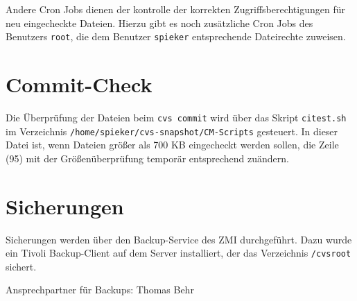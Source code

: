 \documentclass[a4paper, 10pt]{article}
\newcommand{\file}[1]{\texttt{#1}}
\begin{document}
Andere Cron Jobs dienen der kontrolle der korrekten Zugriffsberechtigungen f\"ur
neu eingecheckte Dateien. Hierzu gibt es noch zus\"atzliche Cron Jobs des Benutzers
\file{root}, die dem Benutzer \file{spieker} entsprechende Dateirechte zuweisen.

\section{Commit-Check}
Die \"Uberpr\"ufung der Dateien beim \file{cvs commit} wird \"uber das Skript
\file{citest.sh} im Verzeichnis \file{/home/spieker/cvs-snapshot/CM-Scripts}
gesteuert. In dieser Datei ist, wenn Dateien gr\"o\ss{}er als
700 KB eingecheckt werden sollen, die Zeile (95) mit der Gr\"o\ss{}en\"uberpr\"ufung
tempor\"ar entsprechend zu\"andern.

\section{Sicherungen}
Sicherungen werden \"uber den Backup-Service des ZMI durchgef\"uhrt. Dazu
wurde ein Tivoli Backup-Client auf dem Server installiert, der das Verzeichnis
\file{/cvsroot} sichert.

Ansprechpartner f\"ur Backups: Thomas Behr
\end{document}
